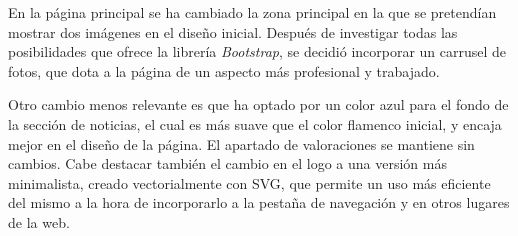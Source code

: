 \documentclass[11pt, a4paper]{book}
\begin{document}
	En la página principal se ha cambiado la zona principal en la que se pretendían mostrar dos imágenes en el diseño inicial. Después de investigar todas las posibilidades que ofrece la librería \textit{Bootstrap}, se decidió incorporar un carrusel de fotos, que dota a la página de un aspecto más profesional y trabajado.
	
	Otro cambio menos relevante es que ha optado por un color azul para el fondo de la sección de noticias, el cual es más suave que el color flamenco inicial, y encaja mejor en el diseño de la página. El apartado de valoraciones se mantiene sin cambios. Cabe destacar también el cambio en el logo a una versión más minimalista, creado vectorialmente con SVG, que permite un uso más eficiente del mismo a la hora de incorporarlo a la pestaña de navegación y en otros lugares de la web.
	
\end{document}
